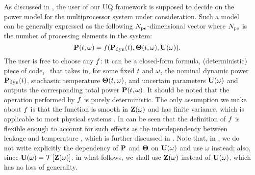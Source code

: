 As discussed in , the user of our UQ framework is supposed to decide on the power model for the multiprocessor system under consideration. Such a model can be generally expressed as the following ${N_\text{pe}}$-dimensional vector where ${N_\text{pe}}$ is the number of processing elements in the system:
\begin{equation} \elabel{power-model}
  \vP(\t, \o) = \f(\vP_\dyn(\t), \vTO(\t, \o), \vU(\o)).
\end{equation}
The user is free to choose any $f$: it can be a closed-form formula, (deterministic) piece of code, \etc\ that takes in, for some fixed $t$ and $\omega$, the nominal dynamic power $\mathbf{P}_{\text{dyn}}(t)$, stochastic temperature ${\boldsymbol\Theta}(t, \omega)$, and uncertain parameters $\mathbf{U}(\omega)$ and outputs the corresponding total power $\mathbf{P}(t, \omega)$. It should be noted that the operation performed by $f$ is purely deterministic. The only assumption we make about $f$ is that the function is smooth in $\mathbf{Z}(\omega)$ and has finite variance, which is applicable to most physical systems \cite{xiu2002}. In can be seen that the definition of $f$ is flexible enough to account for such effects as the interdependency between leakage and temperature \cite{srivastava2010, liu2007}, which is further discussed in . Note that, in , we do not write explicitly the dependency of $\mathbf{P}$ and ${\boldsymbol\Theta}$ on $\mathbf{U}(\omega)$ and use $\omega$ instead; also, since $\mathbf{U}(\omega) = \mathcal{T}\left[\mathbf{Z}(\omega)\right]$, in what follows, we shall use $\mathbf{Z}(\omega)$ instead of $\mathbf{U}(\omega)$, which has no loss of generality.

